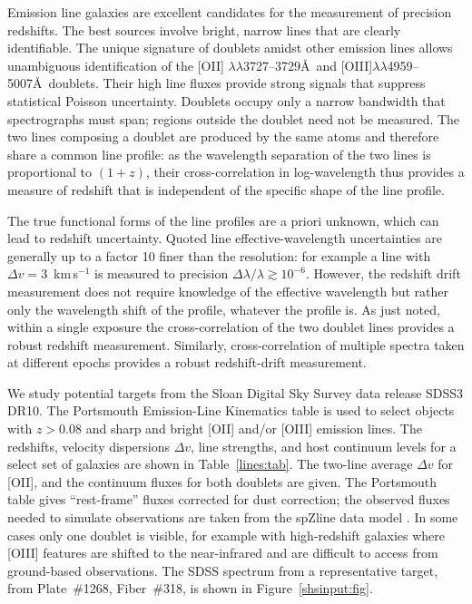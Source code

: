 \documentclass[preprint2, 10pt]{aastex}
\begin{document}
Emission line galaxies are excellent candidates for the measurement of 
precision redshifts. The best sources involve bright, narrow lines that 
are clearly identifiable. 
The unique signature
of doublets amidst  other emission lines allows unambiguous identification of the [OII] $\lambda\lambda$3727--3729\AA\ 
and [OIII]$\lambda\lambda$4959--5007\AA\ doublets.
Their high line fluxes provide strong signals that suppress statistical Poisson uncertainty.
Doublets occupy only a narrow bandwidth that spectrographs must span; 
regions outside the doublet need not be measured. 
The two lines composing a doublet are produced by the same atoms and therefore
share a common line profile: as the wavelength separation of the two lines is proportional to $(1+z)$, their cross-correlation in log-wavelength
thus provides a measure of redshift that is independent of the specific shape of the line profile.

The true functional forms of the line profiles are a priori unknown, which can lead to redshift uncertainty.  Quoted line effective-wavelength uncertainties
are generally up to a factor 10 finer than the resolution: for example a line with $\Delta v=3$~km\,s$^{-1}$ is measured to
precision $\Delta \lambda/\lambda \gtrsim 10^{-6}$.
However, the redshift drift measurement does not require knowledge of the effective wavelength but rather only the wavelength shift
of the profile, whatever the profile is. 
As just noted, within a single exposure the cross-correlation of the two doublet lines provides a robust redshift measurement.
Similarly, cross-correlation of multiple spectra taken at different epochs provides a robust redshift-drift measurement. 

We study potential targets from the Sloan Digital Sky Survey data release SDSS3 DR10.  The  Portsmouth Emission-Line Kinematics table \citep{2013MNRAS.431.1383T}  is used to select
objects 
with $z>0.08$
and sharp and bright [OII] and/or [OIII] emission lines.
The redshifts, velocity dispersions $\Delta v$, line strengths, and host continuum levels for a select set of galaxies are shown in Table~\ref{lines:tab}. 
The two-line average $\Delta v$ for [OII], and the continuum fluxes for both doublets  are given.
The Portsmouth table  gives ``rest-frame'' fluxes corrected for dust correction;
the observed fluxes needed to simulate observations are taken from the spZline data model
\citep{2012AJ....144..144B}.  In some cases only one doublet is visible, for example with high-redshift galaxies where [OIII] features are shifted to the near-infrared and are difficult to access from ground-based observations.
The SDSS spectrum from a representative 
target, from Plate~\#1268, Fiber~\#318, is shown in Figure~\ref{shsinput:fig}. 
\end{document}
